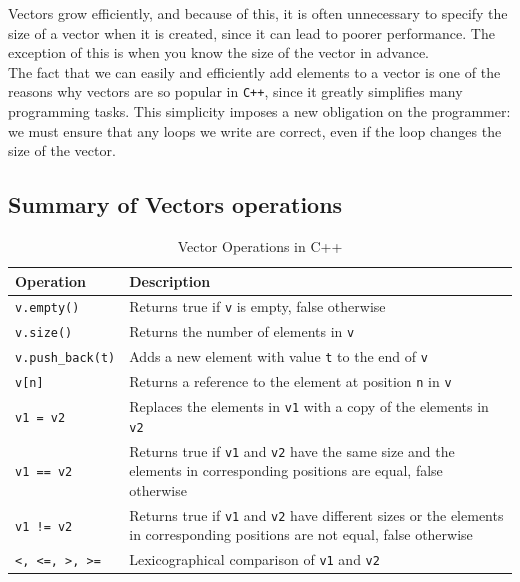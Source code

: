 Vectors grow efficiently, and because of this, it is often unnecessary to specify the size of a vector when it is created,
since it can lead to poorer performance. The exception of this is when you know the size of the vector in advance.\\

The fact that we can easily and efficiently add elements to a vector is one of the reasons why vectors are so popular in
\texttt{C++}, since it greatly simplifies many programming tasks. This simplicity imposes a new obligation on the programmer:
we must ensure that any loops we write are correct, even if the loop changes the size of the vector.\\

\subsection{Summary of Vectors operations}

\begin{table}[ht]
\centering
\begin{tabular}{|l|p{7cm}|}
\hline
\textbf{Operation} & \textbf{Description} \\
\hline
\texttt{v.empty()} & Returns true if \texttt{v} is empty, false otherwise \\
\hline
\texttt{v.size()} & Returns the number of elements in \texttt{v} \\
\hline
\texttt{v.push\_back(t)} & Adds a new element with value \texttt{t} to the end of \texttt{v} \\
\hline
\texttt{v[n]} & Returns a reference to the element at position \texttt{n} in \texttt{v} \\
\hline
\texttt{v1 = v2} & Replaces the elements in \texttt{v1} with a copy of the elements in \texttt{v2} \\
\hline
\texttt{v1 == v2} & Returns true if \texttt{v1} and \texttt{v2} have the same size and the elements in corresponding positions are equal, false otherwise \\
\hline
\texttt{v1 != v2} & Returns true if \texttt{v1} and \texttt{v2} have different sizes or the elements in corresponding positions are not equal, false otherwise \\
\hline
\texttt{<, <=, >, >=} & Lexicographical comparison of \texttt{v1} and \texttt{v2} \\
\hline
\end{tabular}
\caption{Vector Operations in C++}
\label{tab:vector_operations}
\end{table}





